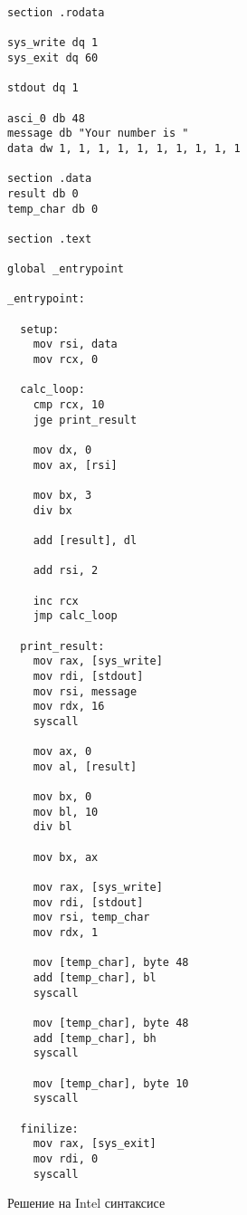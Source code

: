 \documentclass[a4paper]{article}
\begin{document}
  \begin{listing}[H]
    \begin{verbatim}
section .rodata

sys_write dq 1
sys_exit dq 60

stdout dq 1

asci_0 db 48
message db "Your number is " 
data dw 1, 1, 1, 1, 1, 1, 1, 1, 1, 1

section .data
result db 0
temp_char db 0

section .text

global _entrypoint

_entrypoint:
 
  setup:
    mov rsi, data
    mov rcx, 0

  calc_loop:
    cmp rcx, 10
    jge print_result

    mov dx, 0
    mov ax, [rsi]

    mov bx, 3
    div bx

    add [result], dl

    add rsi, 2

    inc rcx
    jmp calc_loop 

  print_result:
    mov rax, [sys_write]
    mov rdi, [stdout]
    mov rsi, message
    mov rdx, 16
    syscall

    mov ax, 0
    mov al, [result]

    mov bx, 0
    mov bl, 10
    div bl

    mov bx, ax

    mov rax, [sys_write]
    mov rdi, [stdout]
    mov rsi, temp_char
    mov rdx, 1

    mov [temp_char], byte 48
    add [temp_char], bl
    syscall

    mov [temp_char], byte 48
    add [temp_char], bh
    syscall

    mov [temp_char], byte 10
    syscall

  finilize:
    mov rax, [sys_exit]
    mov rdi, 0
    syscall  
    \end{verbatim}
    \caption{Решение на Intel синтаксисе}
  \end{listing}
\end{document}
